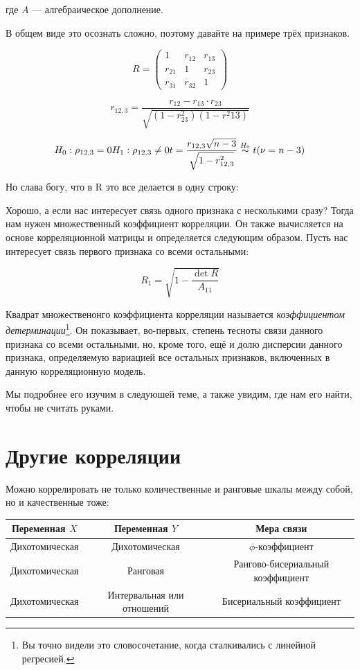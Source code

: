 \documentclass[
  letterpaper,
]{scrbook}
\theoremstyle{definition}
\theoremstyle{remark}
\begin{document}
где \(A\) --- алгебраическое дополнение.

В общем виде это осознать сложно, поэтому давайте на примере трёх
признаков.

\[
R =
\begin{pmatrix}
1 & r_{12} & r_{13} \\
r_{21} & 1 & r_{23} \\
r_{31} & r_{32} & 1
\end{pmatrix}
\]

\[
r_{12,3} = \frac{r_{12} - r_{13} \cdot r_{23}}{\sqrt{(1 - r^2_{23})(1-r^2{13})}}
\]

\[
H_0: \rho_{12,3} = 0 \\
H_1: \rho_{12,3} \neq 0 \\
t = \frac{r_{12,3} \sqrt{n-3}}{\sqrt{1 - r^2_{12,3}}} \overset{H_0}{\thicksim} t(\nu = n-3)
\]

Но слава богу, что в R это все делается в одну строку:

Хорошо, а если нас интересует связь одного признака с несколькими сразу?
Тогда нам нужен множественный коэффициент корреляции. Он также
вычисляется на основе корреляционной матрицы и определяется следующим
образом. Пусть нас интересует связь первого признака со всеми
остальными:

\[
R_1 = \sqrt{1 - \frac{\det R}{A_{11}}}
\]

Квадрат множественонго коэффициента корреляции называется
\emph{коэффициентом детерминации}\footnote{Вы точно видели это
  словосочетание, когда сталкивались с линейной регресией.}. Он
показывает, во-первых, степень тесноты связи данного признака со всеми
остальными, но, кроме того, ещё и долю дисперсии данного признака,
определяемую вариацией все остальных признаков, включенных в данную
корреляционную модель.

Мы подробнее его изучим в следуюшей теме, а также увидим, где нам его
найти, чтобы не считать руками.

\section{Другие
корреляции}\label{ux434ux440ux443ux433ux438ux435-ux43aux43eux440ux440ux435ux43bux44fux446ux438ux438}

Можно коррелировать не только количественные и ранговые шкалы между
собой, но и качественные тоже:

\begin{longtable}[]{@{}ccc@{}}
\toprule\noalign{}
Переменная \(X\) & Переменная \(Y\) & Мера связи \\
\midrule\noalign{}
\endhead
\bottomrule\noalign{}
\endlastfoot
Дихотомическая & Дихотомическая & \(\phi\)-коэффициент \\
Дихотомическая & Ранговая & Рангово-бисериальный коэффициент \\
Дихотомическая & Интервальная или отношений & Бисериальный
коэффициент \\
\end{longtable}
\end{document}
